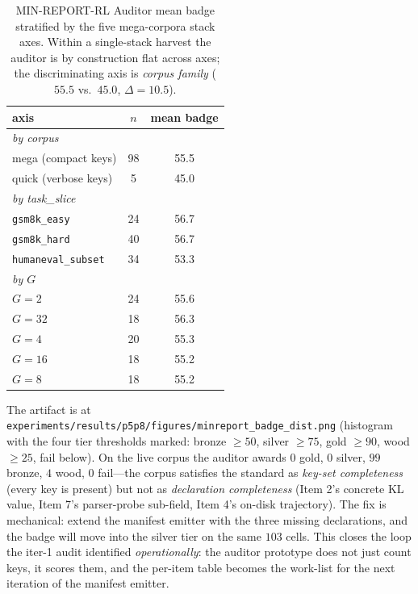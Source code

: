 \documentclass{article}  \usepackage[preprint,nonatbib]{neurips_2026} \usepackage[numbers]{natbib}
\begin{document}
\begin{table}[t]
\centering
\caption{MIN-REPORT-RL Auditor mean badge stratified by the five
mega-corpora stack axes. Within a single-stack harvest the auditor
is by construction flat across axes; the discriminating axis is
\emph{corpus family} ($55.5$ vs.\ $45.0$, $\Delta = 10.5$).}
\label{tab:p5-auditor-stratified}
\small
\begin{tabular}{@{}lcc@{}}
\toprule
axis & $n$ & mean badge \\
\midrule
\textit{by corpus}    &             & \\
\quad mega (compact keys)        & 98 & 55.5 \\
\quad quick (verbose keys)        &  5 & 45.0 \\
\textit{by task\_slice} &             & \\
\quad \texttt{gsm8k\_easy}        & 24 & 56.7 \\
\quad \texttt{gsm8k\_hard}        & 40 & 56.7 \\
\quad \texttt{humaneval\_subset} & 34 & 53.3 \\
\textit{by $G$}        &             & \\
\quad $G=2$                       & 24 & 55.6 \\
\quad $G=32$                      & 18 & 56.3 \\
\quad $G=4$                       & 20 & 55.3 \\
\quad $G=16$                      & 18 & 55.2 \\
\quad $G=8$                       & 18 & 55.2 \\
\bottomrule
\end{tabular}
\end{table}

The artifact is at
\texttt{experiments/results/p5p8/figures/minreport\_badge\_dist.png}
(histogram with the four tier thresholds marked: bronze $\ge 50$,
silver $\ge 75$, gold $\ge 90$, wood $\ge 25$, fail below). On the
live corpus the auditor awards $0$ gold, $0$ silver, $99$ bronze,
$4$ wood, $0$ fail---the corpus satisfies the standard as
\emph{key-set completeness} (every key is present) but not as
\emph{declaration completeness} (Item 2's concrete KL value, Item 7's
parser-probe sub-field, Item 4's on-disk trajectory). The fix is
mechanical: extend the manifest emitter with the three missing
declarations, and the badge will move into the silver tier on the
same $103$ cells. This closes the loop the iter-1 audit identified
\emph{operationally}: the auditor prototype does not just count keys,
it scores them, and the per-item table becomes the work-list for the
next iteration of the manifest emitter.
\end{document}
